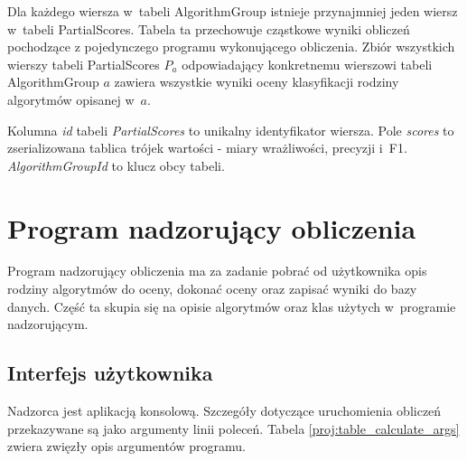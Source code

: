 \documentclass[../thesis.tex]{subfiles}
\begin{document}
Dla każdego wiersza w~tabeli AlgorithmGroup istnieje przynajmniej jeden wiersz w~tabeli PartialScores. Tabela ta przechowuje cząstkowe wyniki obliczeń pochodzące z pojedynczego programu wykonującego obliczenia. Zbiór wszystkich wierszy tabeli PartialScores $P_a$ odpowiadający konkretnemu wierszowi tabeli AlgorithmGroup $a$ zawiera wszystkie wyniki oceny klasyfikacji rodziny algorytmów opisanej w~$a$.

Kolumna \emph{id} tabeli \emph{PartialScores} to unikalny identyfikator wiersza. Pole \emph{scores} to zserializowana tablica trójek wartości - miary wrażliwości, precyzji i~F1. \emph{AlgorithmGroupId} to klucz obcy tabeli.

\section{Program nadzorujący obliczenia}
\label{proj:supervisor}

Program nadzorujący obliczenia ma za zadanie pobrać od użytkownika opis rodziny algorytmów do oceny, dokonać oceny oraz zapisać wyniki do bazy danych. Część ta skupia się na opisie algorytmów oraz klas użytych w~programie nadzorującym.

\subsection{Interfejs użytkownika}

Nadzorca jest aplikacją konsolową. Szczegóły dotyczące uruchomienia obliczeń przekazywane są jako argumenty linii poleceń. Tabela \ref{proj:table_calculate_args} zwiera zwięzły opis argumentów programu. 
\end{document}
